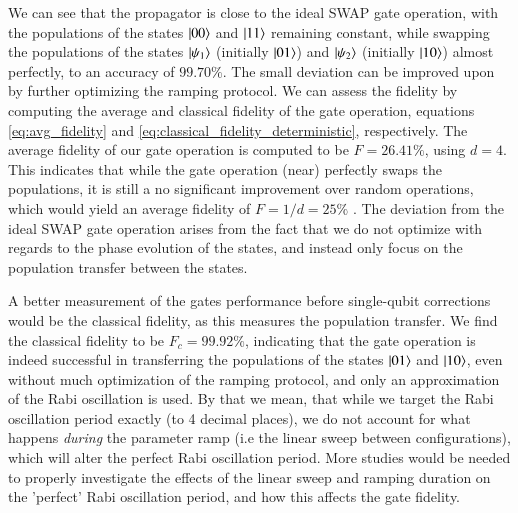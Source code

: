 \documentclass{subfiles}
\begin{document}
We can see that the propagator is close to the ideal SWAP gate operation, with the populations of the states $\ket{00}$ and $\ket{11}$ remaining constant, while swapping the populations of the states $\ket{\psi_1}$  (initially $\ket{01}$) and $\ket{\psi_2}$ (initially $\ket{10}$) almost perfectly, to an accuracy of $99.70\%$. The small deviation can be improved upon by further optimizing the ramping protocol. We can assess the fidelity by computing the average and classical fidelity of the gate operation, equations \eqref{eq:avg_fidelity} and \eqref{eq:classical_fidelity_deterministic}, respectively. The average fidelity of our gate operation is computed to be $F = 26.41\%$, using $d=4$. This indicates that while the gate operation (near) perfectly swaps the populations, it is still a no significant improvement over random operations, which would yield an average fidelity of $F = 1/d = 25\%$ \cite{zyczkowski2005average}. The deviation from the ideal SWAP gate operation arises from the fact that we do not optimize with regards to the phase evolution of the states, and instead only focus on the population transfer between the states. 

A better measurement of the gates performance before single-qubit corrections would be the classical fidelity, as this measures the population transfer. We find the classical fidelity to be $F_c = 99.92\%$, indicating that the gate operation is indeed successful in transferring the populations of the states $\ket{01}$ and $\ket{10}$, even without much optimization of the ramping protocol, and only an approximation of the Rabi oscillation is used. By that we mean, that while we target the Rabi oscillation period exactly (to 4 decimal places), we do not account for what happens \emph{during} the parameter ramp (i.e the linear sweep between configurations), which will alter the perfect Rabi oscillation period. More studies would be needed to properly investigate the effects of the linear sweep and ramping duration on the 'perfect' Rabi oscillation period, and how this affects the gate fidelity.
\end{document}
